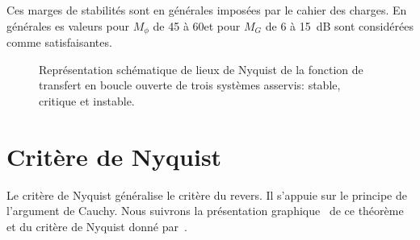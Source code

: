 Ces marges de stabilités sont en générales imposées par le cahier des charges.
En générales es valeurs pour $M_{\phi}$ de 45 à 60\degree et
pour $M_G$ de 6 à 15~\si{\dB} sont considérées comme satisfaisantes.
\begin{figure}[!h]
    \centering
    
    \caption{Représentation schématique de lieux de Nyquist de la fonction 
             de transfert en boucle ouverte de trois systèmes asservis: 
             stable, critique et instable. \label{fig-nyquist_revers}}
\end{figure}
\clearpage
\section{Critère de Nyquist}
Le critère de Nyquist généralise le critère du revers.
Il s'appuie sur le principe de l'argument de Cauchy.
Nous suivrons la présentation \og graphique\fg~ de ce théorème 
et du critère de Nyquist donné par~\cite{reg,katkim}. 
